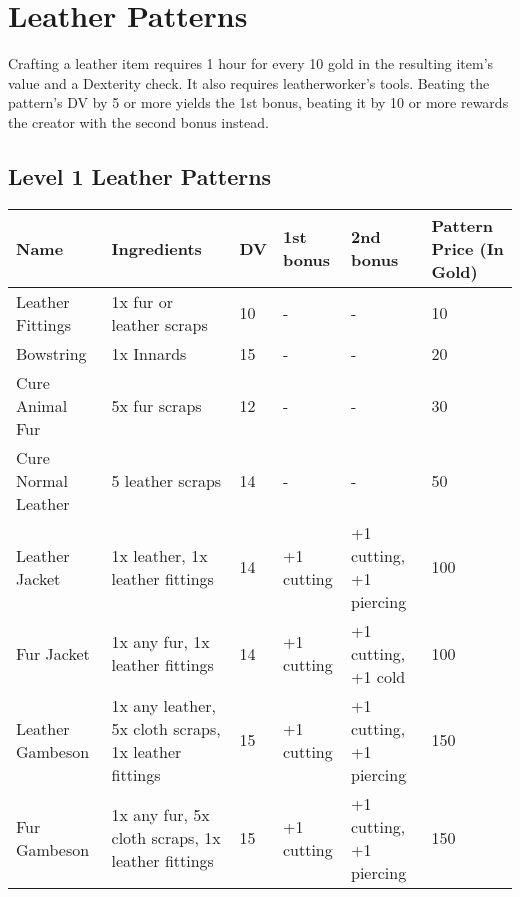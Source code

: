 \section{Leather Patterns}\label{sec:leatherPatterns}
Crafting a leather item requires 1 hour for every 10 gold in the resulting item's value and a Dexterity check.
It also requires leatherworker's tools.
Beating the pattern's DV by 5 or more yields the 1st bonus, beating it by 10 or more rewards the creator with the second bonus instead.\\

\subsection{Level 1 Leather Patterns}
\begin{longtable}{p{1.5cm} | p{2.5cm} | l | p{2cm} | p{2cm} | p{1cm} }
	Name & Ingredients & DV  & 1st bonus & 2nd bonus & Pattern Price (In Gold)\\ \hline
	Leather Fittings & 1x fur or leather scraps & 10 & - & - & 10\\
	Bowstring & 1x Innards & 15 & - & - & 20\\
	Cure Animal Fur & 5x fur scraps & 12 & - & - & 30\\
	Cure Normal Leather & 5 leather scraps & 14 & - & - & 50\\
	Leather Jacket & 1x leather, 1x leather fittings & 14 & +1 cutting & +1 cutting, +1 piercing & 100\\
	Fur Jacket & 1x any fur, 1x leather fittings & 14 & +1 cutting & +1 cutting, +1 cold & 100\\
	Leather Gambeson & 1x any leather, 5x cloth scraps, 1x leather fittings & 15 & +1 cutting & +1 cutting, +1 piercing & 150\\
	Fur Gambeson & 1x any fur, 5x cloth scraps, 1x leather fittings & 15 & +1 cutting & +1 cutting, +1 piercing & 150\\
\end{longtable}
%
%
%
